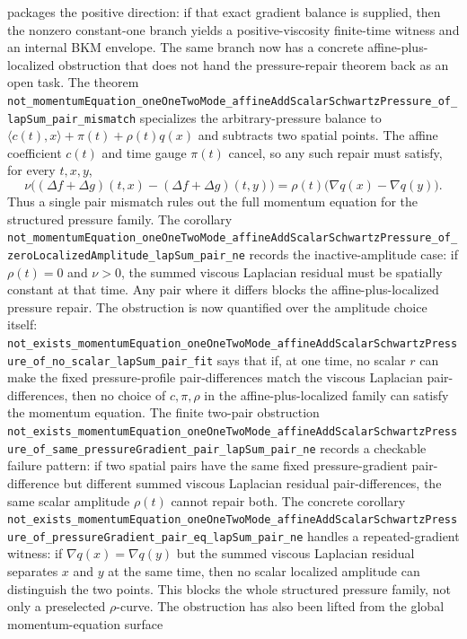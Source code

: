 \documentclass[11pt]{article}
\theoremstyle{remark}
\begin{document}
packages the positive direction: if that exact gradient balance is supplied,
then the nonzero constant-one branch yields a positive-viscosity finite-time
witness and an internal BKM envelope.
The same branch now has a concrete affine-plus-localized obstruction that
does not hand the pressure-repair theorem back as an open task.  The theorem
\texttt{not\_momentumEquation\_oneOneTwoMode\_affineAddScalarSchwartzPressure\_of\_lapSum\_pair\_mismatch}
specializes the arbitrary-pressure balance to
\(\langle c(t),x\rangle+\pi(t)+\rho(t)q(x)\) and subtracts two spatial points.
The affine coefficient \(c(t)\) and time gauge \(\pi(t)\) cancel, so any such
repair must satisfy, for every \(t,x,y\),
\[
  \nu\big((\Delta f+\Delta g)(t,x)-(\Delta f+\Delta g)(t,y)\big)
  =
  \rho(t)\big(\nabla q(x)-\nabla q(y)\big).
\]
Thus a single pair mismatch rules out the full momentum equation for the
structured pressure family.  The corollary
\texttt{not\_momentumEquation\_oneOneTwoMode\_affineAddScalarSchwartzPressure\_of\_zeroLocalizedAmplitude\_lapSum\_pair\_ne}
records the inactive-amplitude case: if \(\rho(t)=0\) and \(\nu>0\), the
summed viscous Laplacian residual must be spatially constant at that time.
Any pair where it differs blocks the affine-plus-localized pressure repair.
The obstruction is now quantified over the amplitude choice itself:
\texttt{not\_exists\_momentumEquation\_oneOneTwoMode\_affineAddScalarSchwartzPressure\_of\_no\_scalar\_lapSum\_pair\_fit}
says that if, at one time, no scalar \(r\) can make the fixed pressure-profile
pair-differences match the viscous Laplacian pair-differences, then no choice
of \(c,\pi,\rho\) in the affine-plus-localized family can satisfy the momentum
equation.  The finite two-pair obstruction
\texttt{not\_exists\_momentumEquation\_oneOneTwoMode\_affineAddScalarSchwartzPressure\_of\_same\_pressureGradient\_pair\_lapSum\_pair\_ne}
records a checkable failure pattern: if two spatial pairs have the same
fixed pressure-gradient pair-difference but different summed viscous Laplacian
residual pair-differences, the same scalar amplitude \(\rho(t)\) cannot
repair both.  The concrete corollary
\texttt{not\_exists\_momentumEquation\_oneOneTwoMode\_affineAddScalarSchwartzPressure\_of\_pressureGradient\_pair\_eq\_lapSum\_pair\_ne}
handles a repeated-gradient witness: if \(\nabla q(x)=\nabla q(y)\) but the
summed viscous Laplacian residual separates \(x\) and \(y\) at the same time,
then no scalar localized amplitude can distinguish the two points.  This
blocks the whole structured pressure family, not only a preselected
\(\rho\)-curve.
The obstruction has also been lifted from the global momentum-equation surface
\end{document}
